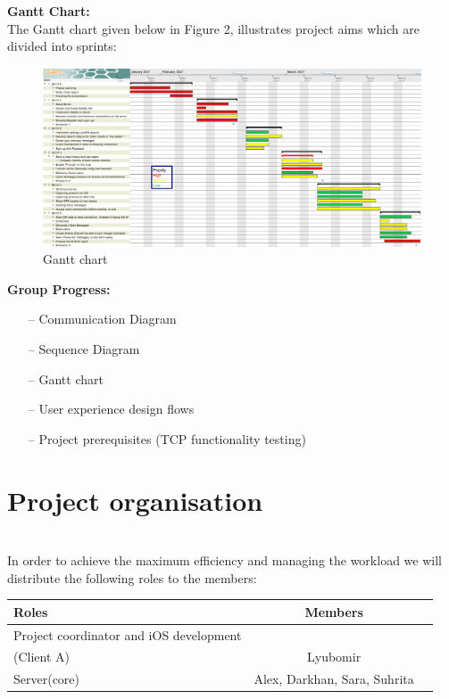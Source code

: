 \documentclass[12pt]{article}
\begin{document}
\textbf{Gantt Chart:}\\
The Gantt chart given below in Figure 2, illustrates project aims which are divided into sprints:
\begin{figure}[ht!]
\centering
\includegraphics[width=1.1\textwidth]{gant_chart.png}
\caption{Gantt chart}
\label{fig:figgantt}
\end{figure}
\textbf{Group Progress:}
\begin{itemize}
\item[--]Communication Diagram
\item[--]Sequence Diagram
\item[--]Gantt chart
\item[--]User experience design flows
\item[--]Project prerequisites (TCP functionality testing)
\end{itemize}
\section{Project organisation} \label{sec:firstpage}\\

In order to achieve the maximum efficiency and managing the workload we will distribute the following roles to the members:
\begin{table}[!ht]
\centering
{} \label{tab:title} 
\smallskip
\begin{tabular}{l c c}
\hline
Roles & Members\\[0.5ex]
\hline
Project coordinator and iOS development \\ (Client A) & Lyubomir \\[0.5ex]
\hline
Server(core) & Alex, Darkhan, Sara, Suhrita \\[0.5ex]
\hline
\end{tabular}
\end{table}
\end{document}
